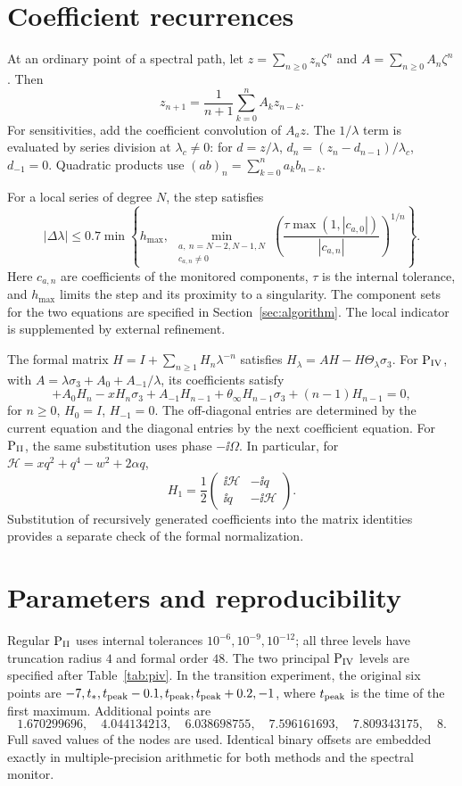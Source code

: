 \appendix
\section{Coefficient recurrences}\label{app:series}
At an ordinary point of a spectral path, let
$z=\sum_{n\ge0}z_n\zeta^n$ and $A=\sum_{n\ge0}A_n\zeta^n$. Then
\begin{equation*}
 z_{n+1}=\frac1{n+1}\sum_{k=0}^n A_kz_{n-k}.
\end{equation*}
For sensitivities, add the coefficient convolution of $A_a z$.
The $1/\lambda$ term is evaluated by series division at
$\lambda_c\ne0$: for $d=z/\lambda$,
$d_n=(z_n-d_{n-1})/\lambda_c$, $d_{-1}=0$.
Quadratic products use $(ab)_n=\sum_{k=0}^n a_kb_{n-k}$.

For a local series of degree $N$, the step satisfies
\[
 |\Delta\lambda|\le0.7\min\left\{h_{\max},\,
 \min_{\substack{a,\ n=N-2,N-1,N\\c_{a,n}\ne0}}
 \left(\frac{\tau\max(1,|c_{a,0}|)}{|c_{a,n}|}\right)^{1/n}\right\}.
\]
Here $c_{a,n}$ are coefficients of the monitored components, $\tau$ is
the internal tolerance, and $h_{\max}$ limits the step and its proximity
to a singularity. The component sets for the two equations are specified
in Section~\ref{sec:algorithm}. The local indicator is supplemented by
external refinement.

The formal matrix $H=I+\sum_{n\ge1}H_n\lambda^{-n}$ satisfies
$H_\lambda=AH-H\Theta_\lambda\sigma_3$.
For $\mathrm{P}_{\mathrm{IV}}$, with $A=\lambda\sigma_3+A_0+A_{-1}/\lambda$, its coefficients
satisfy
\begin{equation*}
 [\sigma_3,H_{n+1}]+A_0H_n-xH_n\sigma_3+A_{-1}H_{n-1}
 +\theta_\infty H_{n-1}\sigma_3+(n-1)H_{n-1}=0,
\end{equation*}
for $n\ge0$, $H_0=I$, $H_{-1}=0$.
The off-diagonal entries are determined by the current equation and
the diagonal entries by the next coefficient equation.
For $\mathrm{P}_{\mathrm{II}}$, the same substitution uses phase $-\ii\Omega$.
In particular, for $\mathcal H=xq^2+q^4-w^2+2\alpha q$,
\[
 H_1=\frac12\begin{pmatrix}\ii\mathcal H&-\ii q\\
 \ii q&-\ii\mathcal H\end{pmatrix}.
\]
Substitution of recursively generated coefficients into the matrix
identities provides a separate check of the formal normalization.

\section{Parameters and reproducibility}\label{app:reproduce}
Regular $\mathrm{P}_{\mathrm{II}}$ uses internal tolerances $10^{-6},10^{-9},10^{-12}$;
all three levels have truncation radius $4$ and formal order $48$.
The two principal $\mathrm{P}_{\mathrm{IV}}$ levels are specified after Table~\ref{tab:piv}.
In the transition experiment, the original six points are
$-7,t_*,t_{\rm peak}-0.1,t_{\rm peak},t_{\rm peak}+0.2,-1$,
where $t_{\rm peak}$ is the time of the first maximum. Additional points are
\[
 1.670299696,\quad4.044134213,\quad6.038698755,\quad
 7.596161693,\quad7.809343175,\quad8.
\]
Full saved values of the nodes are used. Identical binary offsets are
embedded exactly in multiple-precision arithmetic for both methods
and the spectral monitor.

